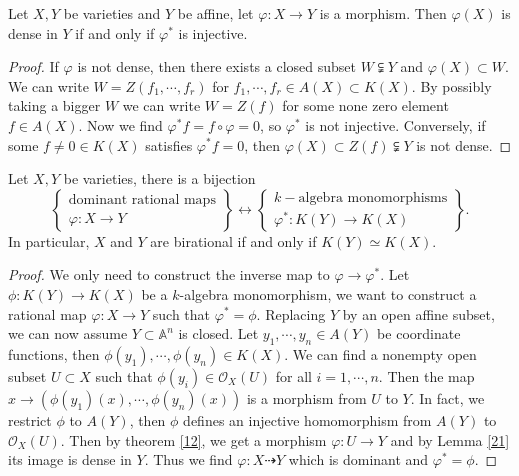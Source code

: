\begin{lemma}\label{21}
	Let $ X,Y $ be varieties and $ Y $ be affine, let $ \varphi:X\to Y $ is a morphism. Then $ \varphi(X) $ is dense in $ Y $ if and only if $ \varphi^\ast $ is injective.
\end{lemma}
\begin{proof}
	If $ \varphi $ is not dense, then there exists a closed subset $ W\subsetneqq Y $ and $ \varphi(X)\subset W $. We can write $ W=Z(f_1,\cdots,f_r) $ for $ f_1,\cdots,f_r\in A(X)\subset K(X) $. By possibly taking a bigger $ W $ we can write $ W=Z(f) $ for some none zero element $ f\in A(X) $. Now we find $ \varphi^\ast f=f\circ\varphi =0 $, so $ \varphi^\ast $ is not injective. Conversely, if some $ f\neq 0 \in K(X) $ satisfies $ \varphi^\ast f=0 $, then $ \varphi(X)\subset Z(f)\subsetneqq Y $ is not dense.
\end{proof}
\begin{theorem}\label{22}
	Let $ X,Y $ be varieties, there is a bijection
	$$
		\left\lbrace\begin{array}{c}
			\text{dominant rational maps} \\
			\varphi:X \to Y
		\end{array}\right\rbrace\longleftrightarrow\left\lbrace\begin{array}{c}
			k-\text{algebra monomorphisms} \\
			\varphi^\ast:K(Y)\to K(X)
		\end{array}\right\rbrace.
	$$
	In particular, $ X $ and $ Y $ are birational if and only if $ K(Y)\simeq K(X) $.
\end{theorem}
\begin{proof}
	We only need to construct the inverse  map to $ \varphi\to \varphi^\ast $. Let $ \phi:K(Y)\to K(X) $ be a $ k $-algebra monomorphism, we want to construct a rational map $ \varphi:X\to Y $ such that $ \varphi^\ast=\phi $. Replacing $ Y $ by an open affine subset, we can now assume $ Y\subset \mathbb{A}^n $ is closed. Let $ y_1,\cdots,y_n\in A(Y) $ be coordinate functions, then $ \phi(y_1),\cdots,\phi(y_n)\in K(X) $. We can find a nonempty open subset $ U\subset X $ such that $ \phi(y_i)\in\mathcal{O}_X(U) $ for all $ i=1,\cdots,n $. Then the map $ x\to (\phi(y_1)(x),\cdots,\phi(y_n)(x)) $ is a morphism from $ U $ to $ Y $. In fact, we restrict $ \phi $ to $ A(Y) $, then $ \phi $ defines an injective homomorphism from $ A(Y) $ to $ \mathcal{O}_X(U) $. Then by theorem \ref{12}, we get a morphism $ \varphi:U\to Y $ and by Lemma \ref{21} its image is dense in $ Y $. Thus we find $ \varphi:X\dashrightarrow Y $ which is dominant and $ \varphi^\ast=\phi $.
\end{proof}
